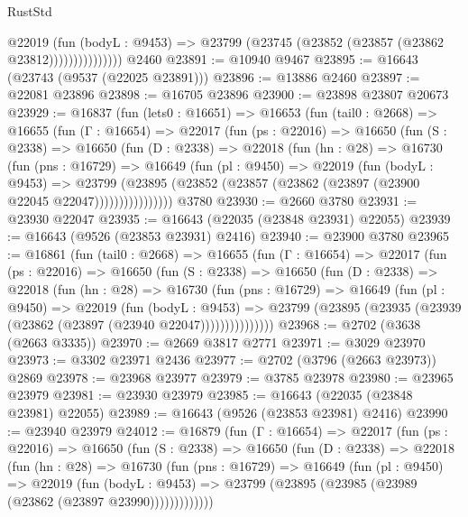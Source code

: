 \begin{lexlean}{RustStd}
\begin{coremodule}
                      @22019
                        (fun (bodyL : @9453) =>
                        @23799 (@23745 (@23852 (@23857 (@23862 @23812)))))))))))))))
    @2460
@23891 := @10940 @9467
@23895 := @16643 (@23743 (@9537 (@22025 @23891)))
@23896 := @13886 @2460
@23897 := @22081 @23896
@23898 := @16705 @23896
@23900 := @23898 @23807 @20673
@23929 := @16837
    (fun (lets0 : @16651) =>
    @16653
      (fun (tail0 : @2668) =>
      @16655
        (fun (Γ : @16654) =>
        @22017
          (fun (ps : @22016) =>
          @16650
            (fun (S : @2338) =>
            @16650
              (fun (D : @2338) =>
              @22018
                (fun (hn : @28) =>
                @16730
                  (fun (pns : @16729) =>
                  @16649
                    (fun (pl : @9450) =>
                    @22019
                      (fun (bodyL : @9453) =>
                      @23799
                        (@23895
                          (@23852 (@23857 (@23862 (@23897 (@23900 @22045 @22047))))))))))))))))
    @3780
@23930 := @2660 @3780
@23931 := @23930 @22047
@23935 := @16643 (@22035 (@23848 @23931) @22055)
@23939 := @16643 (@9526 (@23853 @23931) @2416)
@23940 := @23900 @3780
@23965 := @16861
    (fun (tail0 : @2668) =>
    @16655
      (fun (Γ : @16654) =>
      @22017
        (fun (ps : @22016) =>
        @16650
          (fun (S : @2338) =>
          @16650
            (fun (D : @2338) =>
            @22018
              (fun (hn : @28) =>
              @16730
                (fun (pns : @16729) =>
                @16649
                  (fun (pl : @9450) =>
                  @22019
                    (fun (bodyL : @9453) =>
                    @23799 (@23895 (@23935 (@23939 (@23862 (@23897 (@23940 @22047)))))))))))))))
@23968 := @2702 (@3638 (@2663 @3335))
@23970 := @2669 @3817 @2771
@23971 := @3029 @23970
@23973 := @3302 @23971 @2436
@23977 := @2702 (@3796 (@2663 @23973)) @2869
@23978 := @23968 @23977
@23979 := @3785 @23978
@23980 := @23965 @23979
@23981 := @23930 @23979
@23985 := @16643 (@22035 (@23848 @23981) @22055)
@23989 := @16643 (@9526 (@23853 @23981) @2416)
@23990 := @23940 @23979
@24012 := @16879
    (fun (Γ : @16654) =>
    @22017
      (fun (ps : @22016) =>
      @16650
        (fun (S : @2338) =>
        @16650
          (fun (D : @2338) =>
          @22018
            (fun (hn : @28) =>
            @16730
              (fun (pns : @16729) =>
              @16649
                (fun (pl : @9450) =>
                @22019
                  (fun (bodyL : @9453) =>
                  @23799 (@23895 (@23985 (@23989 (@23862 (@23897 @23990)))))))))))))

\end{coremodule}
\end{lexlean}
